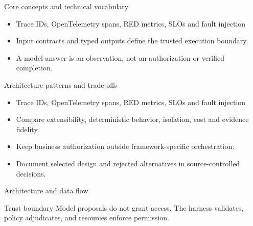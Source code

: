 \documentclass[aspectratio=169,10pt]{beamer}
\begin{document}
\begin{frame}{Core concepts and technical vocabulary}
\small
\begin{itemize}
\item Trace IDs, OpenTelemetry spans, RED metrics, SLOs and fault injection
\item Input contracts and typed outputs define the trusted execution boundary.
\item A model answer is an observation, not an authorization or verified completion.
\end{itemize}

\end{frame}

\begin{frame}{Architecture patterns and trade-offs}
\small
\begin{itemize}
\item Trace IDs, OpenTelemetry spans, RED metrics, SLOs and fault injection
\item Compare extensibility, deterministic behavior, isolation, cost and evidence fidelity.
\item Keep business authorization outside framework-specific orchestration.
\item Document selected design and rejected alternatives in source-controlled decisions.
\end{itemize}

\end{frame}

\begin{frame}{Architecture and data flow}
\small
\centering
{}
\vspace{0.6cm}
\begin{block}{Trust boundary}
Model proposals do not grant access. The harness validates, policy adjudicates, and resources enforce permission.
\end{block}
\end{frame}
\end{document}
